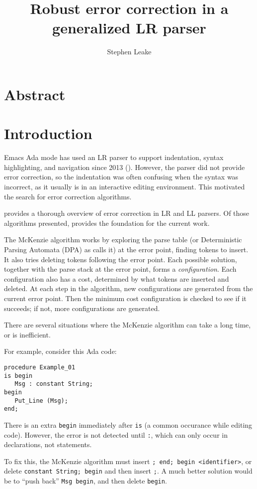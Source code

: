 \documentclass{article}
\title{Robust error correction in a generalized LR parser}
\author{Stephen Leake}
\begin{document}
\section{Abstract}

\section{Introduction}
Emacs Ada mode has used an LR parser to support indentation, syntax
highlighting, and navigation since 2013 (\cite{Emacs Ada mode news}).
However, the parser did not provide error correction, so the
indentation was often confusing when the syntax was incorrect, as it
usually is in an interactive editing environment. This motivated the
search for error correction algorithms.

\cite{Grune 2008} provides a thorough overview of error correction in
LR and LL parsers. Of those algorithms presented, \cite{McKenzie 1995}
provides the foundation for the current work.

The McKenzie algorithm works by exploring the parse table (or
Deterministic Parsing Automata (DPA) as \cite{McKenzie 1995} calls it)
at the error point, finding tokens to insert. It also tries deleting
tokens following the error point. Each possible solution, together
with the parse stack at the error point, forms a
\textit{configuration}. Each configuration also has a cost, determined
by what tokens are inserted and deleted. At each step in the
algorithm, new configurations are generated from the current error
point. Then the minimum cost configuration is checked to see if it
succeeds; if not, more configurations are generated.

There are several situations where the McKenzie algorithm can take a
long time, or is inefficient.

For example, consider this Ada code:
\begin{verbatim}
procedure Example_01
is begin
   Msg : constant String;
begin
   Put_Line (Msg);
end;
\end{verbatim}

There is an extra \verb|begin| immediately after \verb|is| (a common
occurance while editing code). However, the error is not detected
until \verb|:|, which can only occur in declarations, not statements.

To fix this, the McKenzie algorithm must insert
\verb|; end; begin <identifier>|, or delete
\verb|constant String; begin| and then insert \verb|;|. A much better
solution would be to ``push back'' \verb|Msg begin|, and then delete
\verb|begin|.
\end{document}

